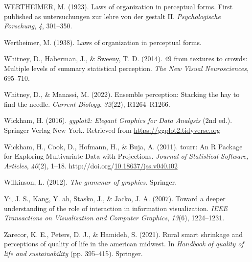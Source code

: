 \documentclass[print]{nuthesis}
\newlength{\cslhangindent}
\newenvironment{CSLReferences}[2]%
{\setlength{\parindent}{0pt}%
\everypar{\setlength{\hangindent}{\cslhangindent}}\ignorespaces}%
{\par}
\begin{document}
\begin{CSLReferences}{1}{0}
\leavevmode{}%
WERTHEIMER, M. (1923). Laws of organization in perceptual forms. First published as untersuchungen zur lehre von der gestalt II. \emph{Psychologische Forschung}, \emph{4}, 301--350.

\leavevmode{}%
Wertheimer, M. (1938). Laws of organization in perceptual forms.

\leavevmode{}%
Whitney, D., Haberman, J., \& Sweeny, T. D. (2014). 49 from textures to crowds: Multiple levels of summary statistical perception. \emph{The New Visual Neurosciences}, 695--710.

\leavevmode{}%
Whitney, D., \& Manassi, M. (2022). Ensemble perception: Stacking the hay to find the needle. \emph{Current Biology}, \emph{32}(22), R1264--R1266.

\leavevmode{}%
Wickham, H. (2016). \emph{{ggplot2: Elegant Graphics for Data Analysis}} (2nd ed.). Springer-Verlag New York. Retrieved from \url{https://ggplot2.tidyverse.org}

\leavevmode{}%
Wickham, H., Cook, D., Hofmann, H., \& Buja, A. (2011). {tourr: An R Package for Exploring Multivariate Data with Projections}. \emph{Journal of Statistical Software, Articles}, \emph{40}(2), 1--18. http://doi.org/\href{https://doi.org/10.18637/jss.v040.i02}{10.18637/jss.v040.i02}

\leavevmode{}%
Wilkinson, L. (2012). \emph{The grammar of graphics}. Springer.

\leavevmode{}%
Yi, J. S., Kang, Y. ah, Stasko, J., \& Jacko, J. A. (2007). Toward a deeper understanding of the role of interaction in information visualization. \emph{IEEE Transactions on Visualization and Computer Graphics}, \emph{13}(6), 1224--1231.

\leavevmode{}%
Zarecor, K. E., Peters, D. J., \& Hamideh, S. (2021). Rural smart shrinkage and perceptions of quality of life in the american midwest. In \emph{Handbook of quality of life and sustainability} (pp. 395--415). Springer.

\end{CSLReferences}


\backmatter
\end{document}

